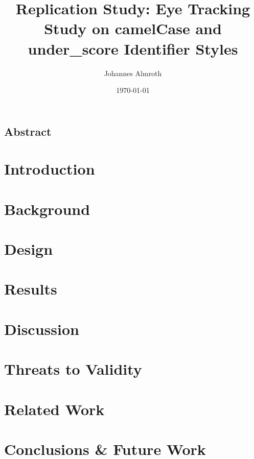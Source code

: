 \documentclass[11pt,titlepage,openright]{book}
\begin{document}
\frontmatter
\title{Replication Study: Eye Tracking Study on camelCase and under\_score Identifier Styles}
\author{Johannes Almroth}
\date{\today}

\maketitle

\vspace*{3cm}
\section*{Abstract}




\tableofcontents
\listoffigures
\listoftables

\mainmatter

\chapter{Introduction}


\chapter{Background}


\chapter{Design}


\chapter{Results}


\chapter{Discussion}


\chapter{Threats to Validity}


\chapter{Related Work}


\chapter{Conclusions \& Future Work}




\end{document}

